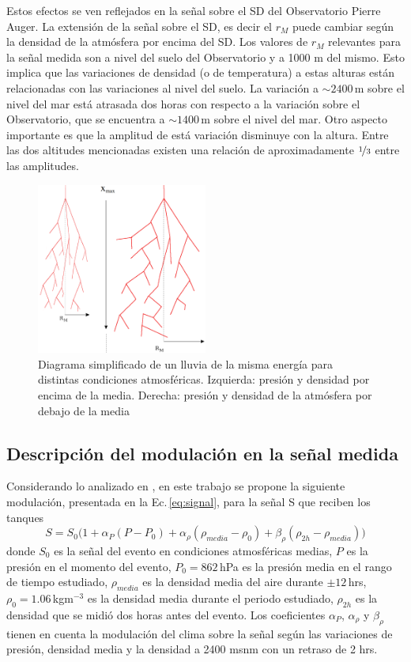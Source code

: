 Estos efectos se ven reflejados en la señal sobre el SD del Observatorio Pierre Auger. La extensión de la señal sobre el SD, es decir el $r_M$ puede cambiar según la densidad de la atmósfera por encima del SD. Los valores de $r_M$ relevantes para la señal medida son a nivel del suelo del Observatorio y a 1000 m del mismo. Esto implica que las variaciones de densidad (o de temperatura) a estas alturas están relacionadas con las variaciones al nivel del suelo. La variación a $\sim2400\,$m sobre el nivel del mar está atrasada dos horas con respecto a la variación sobre el Observatorio, que se encuentra a $\sim1400\,$m sobre el nivel del mar. Otro aspecto importante es que la amplitud de está variación disminuye con la altura. Entre las dos altitudes mencionadas existen una relación de aproximadamente $\nicefrac{1}{3}$ entre las amplitudes. 


\begin{figure}[H]
	\centering
	\includegraphics[width=0.5\textwidth]{eas.png}
	\caption{Diagrama simplificado de un lluvia de la misma energía para distintas condiciones atmosféricas. Izquierda: presión y  densidad  por encima de la media. Derecha: presión y densidad de la atmósfera por debajo de la media}
	\label{fig:eas}
\end{figure}

\subsection{Descripción del modulación en la señal medida}

Considerando lo analizado en \cite{aab2017impact} \cite{collaboration2009atmospheric}, en este trabajo se propone la siguiente modulación, presentada en la Ec.\,\ref{eq:signal}, para la señal S que reciben los tanques 
\begin{equation}
	S=S_0\big(1+\alpha_P(P-P_0) +\alpha_{\rho}(\rho_{media}-\rho_0) + \beta_{\rho}(\rho_{2h}-\rho_{media})\big)
	\label{eq:signal}
\end{equation}
donde $S_0$ es la señal  del evento en condiciones atmosféricas medias, $P$ es la presión en el momento del evento, $P_0=862\,$hPa es la presión media en el rango de tiempo estudiado, $\rho_{media}$ es la densidad media del aire durante $\pm 12\,$hrs,     $\rho_0=1.06\,$kgm$^{-3}$ es la densidad media durante el periodo estudiado, $\rho_{2h}$ es la densidad que se midió dos horas antes del evento. Los coeficientes $\alpha_P$, $\alpha_\rho$ y $\beta_\rho$ tienen en cuenta la modulación del clima sobre la señal según las variaciones de presión,  densidad media y la densidad a 2400 msnm con un retraso de 2 hrs.  

